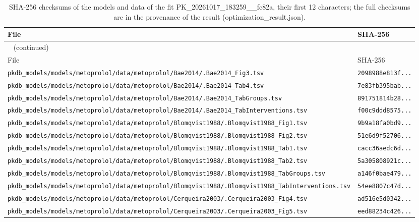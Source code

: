 \documentclass{article}
\begin{document}
\begin{longtable}{ll}
\caption{SHA-256 checksums of the models and data of the fit PK\_20261017\_183259\_\_fc82a, their first 12 characters; the full checksums are in the provenance of the result (optimization\_result.json).}\label{tab:checksums:PK_20261017_183259__fc82a} \\
\toprule
File & SHA-256 \\
\midrule
\endfirsthead
\multicolumn{2}{l}{\small\tablename~\thetable{} (continued)} \\
\toprule
File & SHA-256 \\
\midrule
\endhead
\bottomrule
\endlastfoot
\texttt{pkdb\_models/models/metoprolol/data/metoprolol/Bae2014/.Bae2014\_Fig3.tsv} & \texttt{2098988e813f...} \\
\texttt{pkdb\_models/models/metoprolol/data/metoprolol/Bae2014/.Bae2014\_Tab4.tsv} & \texttt{7e83fb395bab...} \\
\texttt{pkdb\_models/models/metoprolol/data/metoprolol/Bae2014/.Bae2014\_TabGroups.tsv} & \texttt{891751814b28...} \\
\texttt{pkdb\_models/models/metoprolol/data/metoprolol/Bae2014/.Bae2014\_TabInterventions.tsv} & \texttt{f00c9ddd8575...} \\
\texttt{pkdb\_models/models/metoprolol/data/metoprolol/Blomqvist1988/.Blomqvist1988\_Fig1.tsv} & \texttt{9b9a18fa0bd9...} \\
\texttt{pkdb\_models/models/metoprolol/data/metoprolol/Blomqvist1988/.Blomqvist1988\_Fig2.tsv} & \texttt{51e6d9f52706...} \\
\texttt{pkdb\_models/models/metoprolol/data/metoprolol/Blomqvist1988/.Blomqvist1988\_Tab1.tsv} & \texttt{cacc36aedc6d...} \\
\texttt{pkdb\_models/models/metoprolol/data/metoprolol/Blomqvist1988/.Blomqvist1988\_Tab2.tsv} & \texttt{5a305808921c...} \\
\texttt{pkdb\_models/models/metoprolol/data/metoprolol/Blomqvist1988/.Blomqvist1988\_TabGroups.tsv} & \texttt{a146f0bae479...} \\
\texttt{pkdb\_models/models/metoprolol/data/metoprolol/Blomqvist1988/.Blomqvist1988\_TabInterventions.tsv} & \texttt{54ee8807c47d...} \\
\texttt{pkdb\_models/models/metoprolol/data/metoprolol/Cerqueira2003/.Cerqueira2003\_Fig4.tsv} & \texttt{ad516e5d0342...} \\
\texttt{pkdb\_models/models/metoprolol/data/metoprolol/Cerqueira2003/.Cerqueira2003\_Fig5.tsv} & \texttt{eed88234c426...} \\

\end{longtable}
\end{document}
